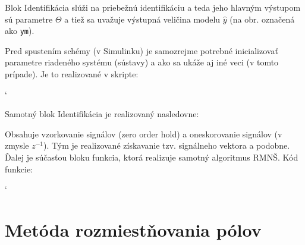 \documentclass[a4paper, 10pt, ]{article}
\begin{document}
\noindent
Blok Identifikácia slúži na priebežnú identifikáciu a teda jeho hlavným výstupom sú parametre $\Theta$ a tiež sa uvažuje výstupná veličina modelu $\hat y$ (na obr. označená ako \lstinline{ym}).

Pred spustením schémy (v Simulinku) je samozrejme potrebné inicializovať parametre riadeného systému (sústavy) a ako sa ukáže aj iné veci (v tomto prípade). Je to realizované v skripte:
{\catcode`

}



\noindent
Samotný blok Identifikácia je realizovaný nasledovne:


\begin{centering}


    \vspace{-2mm}

    \figcaption{}

    \vspace{2mm}

    \label{Identifikacia}

\end{centering}


\noindent
Obsahuje vzorkovanie signálov (zero order hold) a oneskorovanie signálov (v zmysle $z^{-1}$). Tým je realizované získavanie tzv. signálneho vektora a podobne. Ďalej je súčasťou bloku funkcia, ktorá realizuje samotný algoritmus RMNŠ. Kód funkcie:

{\catcode`

}
























\section{Metóda rozmiestňovania pólov}
\end{document}
